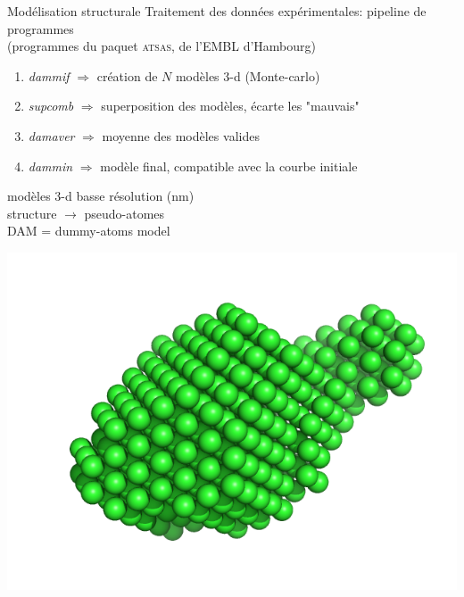\documentclass{beamer}
\begin{document}
\begin{frame}{Mod\'elisation structurale}
Traitement des donn\'ees exp\'erimentales: pipeline de programmes\\
(programmes du paquet \textsc{atsas}, de l'EMBL d'Hambourg)
\begin{enumerate}
  \item \textit{dammif} $\Rightarrow$ cr\'eation de $N$ mod\`eles 3-d 
    (Monte-carlo)
  \item \textit{supcomb} $\Rightarrow$ superposition des mod\`eles, \'ecarte 
    les "mauvais"
  \item \textit{damaver} $\Rightarrow$ moyenne des mod\`eles valides
  \item \textit{dammin} $\Rightarrow$ mod\`ele final, compatible avec la 
    courbe initiale
\end{enumerate}

\begin{minipage}{0.50\linewidth}
    mod\`eles 3-d basse r\'esolution (nm)\\
    structure $\rightarrow$ pseudo-atomes\\
    DAM = dummy-atoms model
\end{minipage}
\begin{minipage}{0.45\linewidth}
    \begin{center}
    \vspace{-0.3cm}
    \hspace{-0.4cm}
    \includegraphics[scale=0.25]{model.png}
    \end{center}
\end{minipage}

\end{frame}
\end{document}

